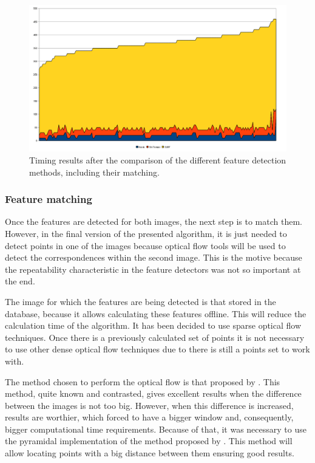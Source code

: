 \begin{figure}[h!]
\centering
\includegraphics{featuresTimeComparison}
\caption{Timing results after the comparison of the different feature detection methods, including their matching.}\label{fig:cp01_features_time_comparison}
\end{figure}

\subsubsection{Feature matching}\label{ch:chapter01_01_02_02}

Once the features are detected for both images, the next step is to match them. However, in the final version of the presented algorithm, it is just needed to detect points in one of the images because optical flow tools will be used to detect the correspondences within the second image. This is the motive because the repeatability characteristic in the feature detectors was not so important at the end.

The image for which the features are being detected is that stored in the database, because it allows calculating these features offline. This will reduce the calculation time of the algorithm. It has been decided to use sparse optical flow techniques. Once there is a previously calculated set of points it is not necessary to use other dense optical flow techniques due to there is still a points set to work with.

The method chosen to perform the optical flow is that proposed by \cite{lucas1981iterative}. This method, quite known and contrasted, gives excellent results when the difference between the images is not too big. However, when this difference is increased, results are worthier, which forced to have a bigger window and, consequently, bigger computational time requirements. Because of that, it was necessary to use the pyramidal implementation of the \cite{lucas1981iterative} method proposed by \cite{bouguet2001pyramidal}. This method will allow locating points with a big distance between them ensuring good results.

